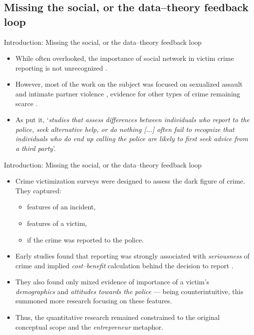 \documentclass{beamer}
\newcommand\citep{
	\parencite
}
\newcommand\citet{
	\textcite
}
\begin{document}
	\subsection{Missing the social, or the data--theory feedback loop}
	\begin{frame}{Introduction: Missing the social, or the data--theory feedback loop}
		\begin{itemize}
			\item  While often overlooked, the importance of social network in victim crime reporting is not unrecognized\citep{bergemann2024social}.
			\item However, most of the work on the subject was focused on sexualized assault and intimate partner violence\citep{baert2024factors}, evidence for other types of crime remaining scarce\citep{xie2019crime}.
			\item As\citet{knoth2019reporting} put it, `\textit{studies that assess differences between individuals who report to the police, seek alternative help, or do nothing [...] often fail to recognize that individuals who do end up calling the police are likely to first seek advice from a third party}'.
		\end{itemize}
	\end{frame}	

	\begin{frame}{Introduction: Missing the social, or the data--theory feedback loop}
		\begin{itemize}
			\item Crime victimization surveys were designed to assess the dark figure of crime. They captured:
			\begin{itemize}
				\item features of an incident,
				\item features of a victim,
				\item if the crime was reported to the police.
			\end{itemize}
			\item Early studies found that reporting was strongly associated with \textit{seriousness} of crime and implied \textit{cost--benefit} calculation behind the decision to report\citep{skogan1984reporting}.
			\item They also found only mixed evidence of importance of a victim's \textit{demographics} and \textit{attitudes towards the police} --- being counterintuitive, this summoned more research focusing on these features.
			\item Thus, the quantitative research remained constrained to the original conceptual scope and the \textit{entrepreneur} metaphor.
		\end{itemize}
	\end{frame}	
\end{document}
